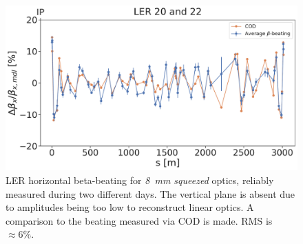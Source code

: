 \begin{figure}[!htb]
    \centering
    \includegraphics[width=0.7\linewidth]{images/kek/ler_20_22_bet_x.pdf}
    \caption{LER horizontal beta-beating for \textit{8~mm squeezed} optics, reliably measured during
    two different days. The vertical plane is absent due to amplitudes being too low to reconstruct
    linear optics. A comparison to the beating measured via COD is made. RMS is $\approx 6\%$.}
    \label{fig:kek:beating_ler_squeezed}
\end{figure}



